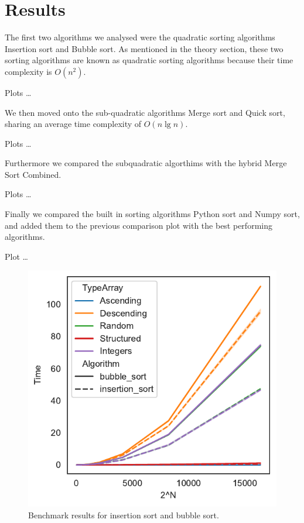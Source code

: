 \documentclass[sigconf, nonacm, natbib, screen, balance=False]{acmart}
\begin{document}
\section{Results}\label{sec:results}

The first two algorithms we analysed were the quadratic sorting algorithms Insertion sort and Bubble sort. As mentioned in the theory section, these two sorting algorithms are known as quadratic sorting algorithms because their time complexity is $O(n^2)$.
 
Plots \dots

We then moved onto the sub-quadratic algorithms Merge sort and Quick sort, sharing an average time complexity of $O(n\lg n)$. 

Plots \dots

Furthermore we compared the subquadratic algorthims with the hybrid Merge Sort Combined.

Plots \dots

Finally we compared the built in sorting algorithms Python sort and Numpy sort, and added them to the previous comparison plot with the best performing algorithms. 

Plot \dots

\begin{figure}
  \centering
  \includegraphics{foo}
  \caption{Benchmark results for insertion sort and bubble sort.}
  \label{fig:bench}
\end{figure}
\end{document}
